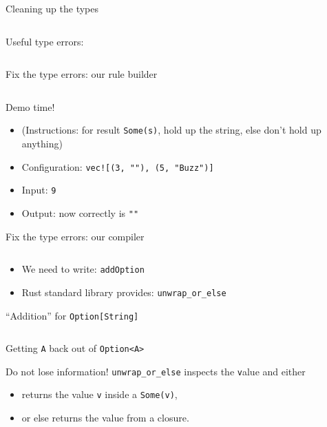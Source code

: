 \begin{frame}[fragile]{Cleaning up the types}
  \inputminted{rust}{FizzBuzz6.rs}

  Useful type errors:

  \inputminted{console}{testQuick10.console}
\end{frame}

\begin{frame}[fragile]{Fix the type errors: our rule builder}
  \inputminted{rust}{FizzBuzz7Rule.rs}

  \begin{block}{Demo time!}
    \begin{itemize}
    \item (Instructions: for result \texttt{Some(s)}, hold up the string, else don't hold up anything)
    \item Configuration: \texttt{vec![(3, ""), (5, "Buzz")]}
    \item Input: \texttt{9}
    \item Output: now correctly is \texttt{""}
    \end{itemize}
  \end{block}
\end{frame}

\begin{frame}[fragile]{Fix the type errors: our compiler}
  \inputminted{rust}{FizzBuzz7.rs}

  \begin{itemize}
  \item We need to write: \texttt{addOption}
  \item Rust standard library provides: \texttt{unwrap_or_else}
  \end{itemize}
\end{frame}

\begin{frame}[fragile]{``Addition'' for \texttt{Option[String]}}
  \inputminted{rust}{FizzBuzz8.rs}
\end{frame}

\begin{frame}[fragile]{Getting \texttt{A} back out of \texttt{Option<A>}}
  \begin{block}{Do not lose information!}
    \texttt{unwrap_or_else} inspects the \texttt value and either
    \begin{itemize}
    \item returns the value \texttt{v} inside a \texttt{Some(v)},
    \item or else returns the value from a closure.
    \end{itemize}
  \end{block}
\end{frame}

